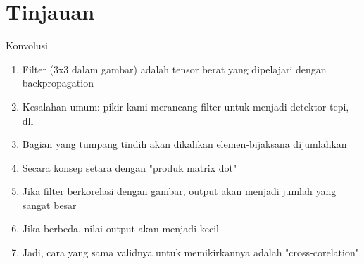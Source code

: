 \section{Tinjauan}
Konvolusi
\begin{enumerate}
\item Filter (3x3 dalam gambar) adalah tensor berat yang dipelajari dengan backpropagation
\item Kesalahan umum: pikir kami merancang filter untuk menjadi detektor tepi, dll
\item Bagian yang tumpang tindih akan dikalikan elemen-bijaksana dijumlahkan
\item Secara konsep setara dengan "produk matrix dot"
\item Jika filter berkorelasi dengan gambar, output akan menjadi jumlah yang sangat besar
\item Jika berbeda, nilai output akan menjadi kecil
\item Jadi, cara yang sama validnya untuk memikirkannya adalah "cross-corelation"
\end{enumerate}